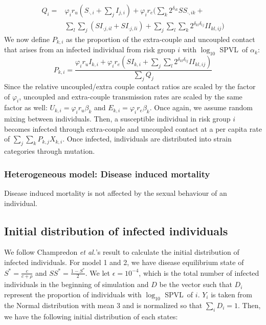 \documentclass[10pt,letterpaper]{article}
\newcommand{\Lspvl}{$\log_{10}$ SPVL}
\newcommand{\etal}{\textit{et al.}}
\begin{document}
\begin{equation}
\begin{aligned}
Q_i = &\varphi_i r_u (S_{\cdot,i} +  \sum_j I_{j,i}) + \varphi_i r_e \bigg( \sum_k 2^{\delta_{ik}} SS_{\cdot, ik} +\\
&\sum_l \sum_j (SI_{\cdot j,il} + SI_{\cdot j, li}) + \sum_j \sum_l \sum_k 2^{\delta_{kl} \delta_{ij}} II_{kl,ij} \bigg)
\end{aligned}
\end{equation}
We now define $P_{k,i}$ as the proportion of the extra-couple and uncoupled contact that arises from an infected individual from risk group $i$ with \Lspvl\ of $\alpha_k$:
\begin{equation}
P_{k,i} = \frac{\varphi_i r_u I_{k,i} + \varphi_i r_e (SI_{k,i} + \sum_j \sum_l 2^{\delta_{kl} \delta_{ij} } II_{kl,ij} )}{\sum_j Q_j}
\end{equation}
Since the relative uncoupled/extra couple contact ratios are scaled by the factor of $\varphi_i$, uncoupled and extra-couple transmission rates are scaled by the same factor as well: $U_{k,i} = \varphi_i r_u \beta_k$ and $E_{k,i} = \varphi_i r_e \beta_k$. Once again, we assume random mixing between individuals. Then, a susceptible individual in risk group $i$ becomes infected through extra-couple and uncoupled contact at a per capita rate of $\sum_j \sum_k P_{k,j} X_{k,i}$. Once infected, individuals are distributed into strain categories through mutation.

\subsubsection*{Heterogeneous model: Disease induced mortality}

Disease induced mortality is not affected by the sexual behaviour of an individual. 

\subsection*{Initial distribution of infected individuals}

We follow Champredon \etal's result to calculate the initial distribution of infected individuals. For model 1 and 2, we have disease equilibrium state of $S^* = \frac{c}{c + \rho}$ and $SS^* = \frac{1-S^*}{2}$. We let $\epsilon = 10^{-4}$, which is the total number of infected individuals in the beginning of simulation and $D$ be the vector such that $D_i$ represent the proportion of individuals with \Lspvl\ of $i$. $Y_i$ is taken from the Normal distribution with mean 3 and is normalized so that $\sum_i D_i = 1$. Then, we have the following initial distribution of each states:
\end{document}
